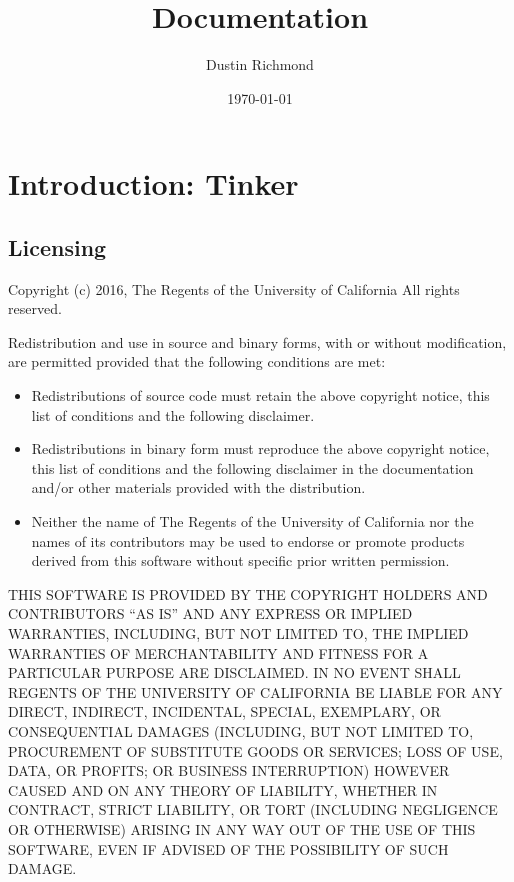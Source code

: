 \documentclass{refrep}
\title{{\TinkerVersion} Documentation}
\author{Dustin Richmond}
\date{\today}
\begin{document}
\maketitle
\pagebreak
\tableofcontents

\chapter{Introduction: Tinker}
\label{Chapter:Intro}
\section{Licensing}

Copyright (c) 2016, The Regents of the University of California All rights
reserved.

Redistribution and use in source and binary forms, with or without modification,
are permitted provided that the following conditions are met:

\begin{itemize}
    \item Redistributions of source code must retain the above copyright
      notice, this list of conditions and the following disclaimer.

    \item Redistributions in binary form must reproduce the above
      copyright notice, this list of conditions and the following
      disclaimer in the documentation and/or other materials provided
      with the distribution.

    \item Neither the name of The Regents of the University of California
      nor the names of its contributors may be used to endorse or
      promote products derived from this software without specific
      prior written permission.
\end{itemize}

THIS SOFTWARE IS PROVIDED BY THE COPYRIGHT HOLDERS AND CONTRIBUTORS ``AS IS''
AND ANY EXPRESS OR IMPLIED WARRANTIES, INCLUDING, BUT NOT LIMITED TO, THE
IMPLIED WARRANTIES OF MERCHANTABILITY AND FITNESS FOR A PARTICULAR PURPOSE ARE
DISCLAIMED. IN NO EVENT SHALL REGENTS OF THE UNIVERSITY OF CALIFORNIA BE LIABLE
FOR ANY DIRECT, INDIRECT, INCIDENTAL, SPECIAL, EXEMPLARY, OR CONSEQUENTIAL
DAMAGES (INCLUDING, BUT NOT LIMITED TO, PROCUREMENT OF SUBSTITUTE GOODS OR
SERVICES; LOSS OF USE, DATA, OR PROFITS; OR BUSINESS INTERRUPTION) HOWEVER
CAUSED AND ON ANY THEORY OF LIABILITY, WHETHER IN CONTRACT, STRICT LIABILITY, OR
TORT (INCLUDING NEGLIGENCE OR OTHERWISE) ARISING IN ANY WAY OUT OF THE USE OF
THIS SOFTWARE, EVEN IF ADVISED OF THE POSSIBILITY OF SUCH DAMAGE.
\end{document}
